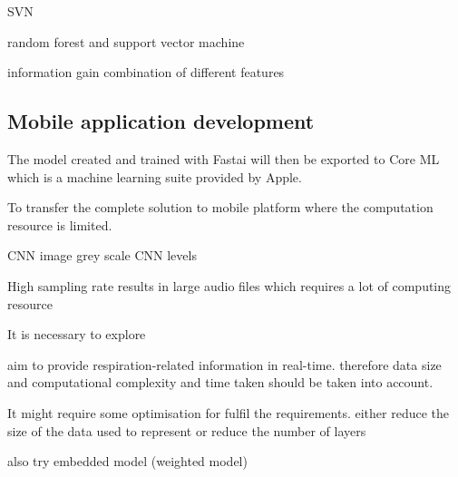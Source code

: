 SVN

random forest and support vector machine

information gain
combination of different features


\subsection{Mobile application development}

The model created and trained with Fastai will then be exported to Core ML which is a machine learning suite provided by Apple.

To transfer the complete solution to mobile platform where the computation resource is limited. 

CNN image grey scale
CNN levels

High sampling rate results in large audio files which requires a lot of computing resource 


It is necessary to explore 

aim to provide respiration-related information in real-time. therefore data size and computational complexity and time taken should be taken into account.

It might require some optimisation for fulfil the requirements. either reduce the size of the data used to represent or reduce the number of layers

also try embedded model (weighted model)
